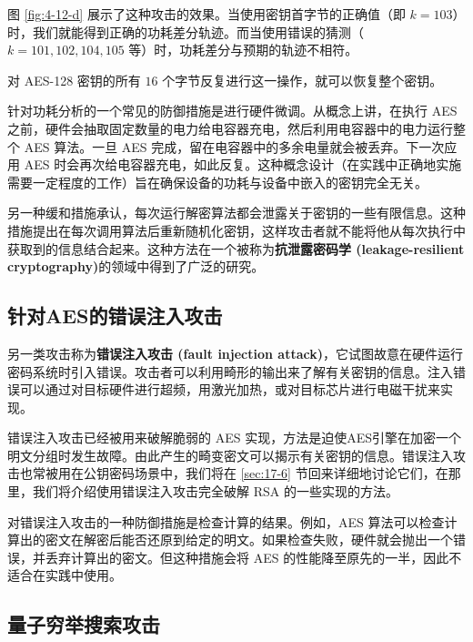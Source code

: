 \begin{snote}[差分功耗分析。]
\vspace*{5pt}

\noindent
图 \ref{fig:4-12-d} 展示了这种攻击的效果。当使用密钥首字节的正确值（即 $k=103$）时，我们就能得到正确的功耗差分轨迹。而当使用错误的猜测（$k=101,102,104,105$ 等）时，功耗差分与预期的轨迹不相符。

对 AES-128 密钥的所有 $16$ 个字节反复进行这一操作，就可以恢复整个密钥。
\end{snote}

\begin{snote}[缓和措施。]
针对功耗分析的一个常见的防御措施是进行硬件微调。从概念上讲，在执行 AES 之前，硬件会抽取固定数量的电力给电容器充电，然后利用电容器中的电力运行整个 AES 算法。一旦 AES 完成，留在电容器中的多余电量就会被丢弃。下一次应用 AES 时会再次给电容器充电，如此反复。这种概念设计（在实践中正确地实施需要一定程度的工作）旨在确保设备的功耗与设备中嵌入的密钥完全无关。

另一种缓和措施承认，每次运行解密算法都会泄露关于密钥的一些有限信息。这种措施提出在每次调用算法后重新随机化密钥，这样攻击者就不能将他从每次执行中获取到的信息结合起来。这种方法在一个被称为\textbf{抗泄露密码学 (leakage-resilient cryptography)}的领域中得到了广泛的研究。
\end{snote}

\subsection{针对AES的错误注入攻击}\label{subsec:4-3-3}

另一类攻击称为\textbf{错误注入攻击 (fault injection attack)}，它试图故意在硬件运行密码系统时引入错误。攻击者可以利用畸形的输出来了解有关密钥的信息。注入错误可以通过对目标硬件进行超频，用激光加热，或对目标芯片进行电磁干扰来实现。

错误注入攻击已经被用来破解脆弱的 AES 实现，方法是迫使AES引擎在加密一个明文分组时发生故障。由此产生的畸变密文可以揭示有关密钥的信息。错误注入攻击也常被用在公钥密码场景中，我们将在 \ref{sec:17-6} 节回来详细地讨论它们，在那里，我们将介绍使用错误注入攻击完全破解 RSA 的一些实现的方法。

对错误注入攻击的一种防御措施是检查计算的结果。例如，AES 算法可以检查计算出的密文在解密后能否还原到给定的明文。如果检查失败，硬件就会抛出一个错误，并丢弃计算出的密文。但这种措施会将 AES 的性能降至原先的一半，因此不适合在实践中使用。

\subsection{量子穷举搜索攻击}\label{subsec:4-3-4}

